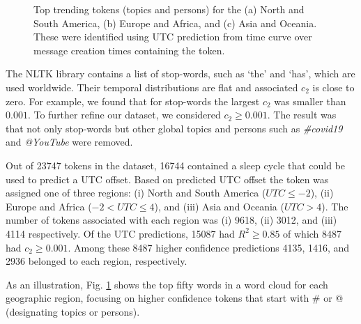 \begin{figure}[htp]
   \caption[Predicted Region for Top Trending Keywords]{Top trending tokens (topics and persons) for the (a) North and South America, (b) Europe and Africa, and (c) Asia and Oceania. These were identified using UTC prediction from time curve over message creation times containing the token.} \label{fig_M1}
\end{figure}

The NLTK library contains a list of stop-words, such as `the' and `has', which are used worldwide. Their temporal distributions are flat and associated $c_2$ is close to zero.  For example, we found that for stop-words the largest $c_2$ was smaller than $0.001$. To further refine our dataset, we considered $c_2 \geq 0.001$. The result was that not only stop-words but other global topics and persons such as \emph{\#covid19} and \emph{@YouTube} were removed. 

Out of 23747 tokens in the dataset, 16744 contained a sleep cycle that could be used to predict a UTC offset. Based on predicted UTC offset the token was assigned one of three regions: (i) North and South America ($UTC\leq -2$), (ii) Europe and Africa ($-2 < UTC \leq 4$), and (iii) Asia and Oceania ($UTC > 4$). The number of tokens associated with each region was (i) 9618, (ii) 3012, and (iii) 4114 respectively. Of the UTC predictions, 15087 had $R^2\geq0.85$ of which 8487 had $c_2\geq 0.001$. Among these 8487 higher confidence predictions 4135, 1416, and 2936 belonged to each region, respectively. 

As an illustration, Fig. \ref{fig_M1} shows the top fifty words in a word cloud for each geographic region,   focusing on higher confidence tokens that start with $\#$ or $@$ %
(designating topics or persons).

